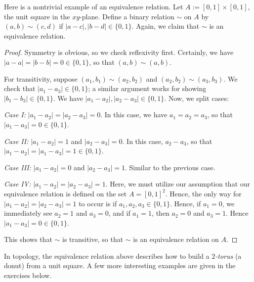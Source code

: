 \documentclass{article}
\begin{document}
\begin{example}
Here is a nontrivial example of an equivalence relation. Let $A := [0, 1]\times [0,1]$, the unit square in the $xy$-plane. Define a binary relation $\sim$ on $A$ by $(a,b)\sim (c,d)$ if $|a-c|, |b-d|\in\{0, 1\}$. Again, we claim that $\sim$ is an equivalence relation.
\end{example}
\begin{proof}
Symmetry is obvious, so we check reflexivity first. Certainly, we have $|a-a| = |b-b| = 0 \in \{0, 1\}$, so that $(a,b)\sim (a,b)$.

For transitivity, suppose $(a_1,b_1)\sim (a_2,b_2)$ and $(a_2, b_2)\sim (a_3,b_3)$. We check that $|a_1-a_3| \in \{0, 1\}$; a similar argument works for showing $|b_1-b_3|\in\{0, 1\}$. We have $|a_1-a_2|, |a_2-a_3| \in \{0, 1\}$. Now, we split cases:

\textit{Case I:} $|a_1-a_2| = |a_2-a_3| = 0$. In this case, we have $a_1 = a_2 = a_3$, so that $|a_1 - a_3| = 0 \in \{0, 1\}$.

\textit{Case II:} $|a_1-a_2| = 1$ and $|a_2-a_3| = 0$. In this case, $a_2 - a_3$, so that $|a_1 - a_2| = |a_1 - a_3| = 1 \in \{0, 1\}$.

\textit{Case III:} $|a_1-a_2| = 0$ and $|a_2-a_3| = 1$. Similar to the previous case.

\textit{Case IV:} $|a_1-a_2| = |a_2-a_3| = 1$. Here, we must utilize our assumption that our equivalence relation is defined on the set $A = [0, 1]^2$. Hence, the only way for $|a_1 - a_2| = |a_2-a_3| = 1$ to occur is if $a_1, a_2,a_3\in \{0, 1\}$. Hence, if $a_1 = 0$, we immediately see $a_2 = 1$ and $a_3 = 0$, and if $a_1 = 1$, then $a_2 = 0$ and $a_3 = 1$. Hence $|a_1 - a_3| = 0 \in \{0, 1\}$.

This shows that $\sim$ is transitive, so that $\sim$ is an equivalence relation on $A$.
\end{proof}

In topology, the equivalence relation above describes how to build a \textit{$2$-torus} (a donut) from a unit square. A few more interesting examples are given in the exercises below.
\end{document}

